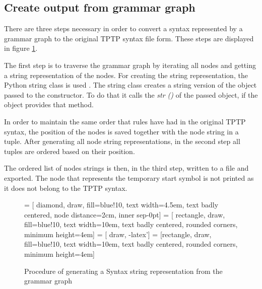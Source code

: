 \subsection{Create output from grammar graph}\label{sec:ConceptOutputGrammarGraph}

There are three steps necessary in order to convert a syntax represented by a grammar graph to the original \ac{TPTP} syntax file form. These steps are displayed in figure \ref{fig:ConceptOutputGrammarGraphProcedure}.

The first step is to traverse the grammar graph by iterating all nodes and getting a string representation of the nodes.
For creating the string representation, the Python string class is used \cite{StringClass}. The string class creates a string version of the object passed to the constructor.
To do that it calls the \textit{\textunderscore \textunderscore str \textunderscore \textunderscore ()} of the passed object, if the object provides that method.

In order to maintain the same order that rules have had in the original \ac{TPTP} syntax, the position of the nodes is saved together with the node string in a tuple. 
After generating all node string representations, in the second step all tuples are ordered based on their position. 

The ordered list of nodes strings is then, in the third step, written to a file and exported.
The node that represents the temporary start symbol is not printed as it does not belong to the \ac{TPTP} syntax. 
 
\begin{figure}[H]
 = [ diamond, draw, fill=blue!10, text width=4.5em, text badly centered, node distance=2cm, inner sep-0pt]  
 = [ rectangle, draw, fill=blue!10, text width=10em, text badly centered, rounded corners, minimum height=4em]  
 = [ draw, -latex']  
 = [rectangle, draw, fill=blue!10, text width=10em, text badly centered, rounded corners, minimum height=4em]  
\begin{center}
\end{center}
\caption{Procedure of generating a Syntax string representation from the grammar graph}
\label{fig:ConceptOutputGrammarGraphProcedure}
\end{figure}

